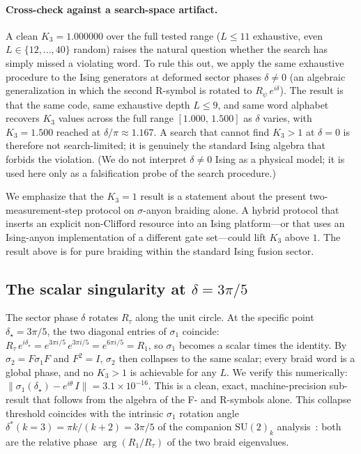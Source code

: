 \documentclass[aps,prx,reprint,amsmath,amssymb,floatfix,nofootinbib,superscriptaddress]{revtex4-2}
\begin{document}
\paragraph{Cross-check against a search-space artifact.}
A clean $K_{3}=1.000000$ over the full tested range ($L\leq11$
exhaustive, even $L\in\{12,\ldots,40\}$ random) raises the natural
question whether the search has simply missed a violating word. To
rule this out, we apply the same exhaustive procedure to the
Ising generators at deformed sector phases $\delta \neq 0$ (an
algebraic generalization in which the second R-symbol is rotated to
$R_{\psi}\,e^{i\delta}$). The result is that the same code, same
exhaustive depth $L \leq 9$, and same word alphabet recovers
$K_{3}$ values across the full range $[1.000,\,1.500]$ as $\delta$
varies, with $K_{3} = 1.500$ reached at $\delta/\pi \approx 1.167$.
A search that cannot find $K_{3} > 1$ at $\delta = 0$ is therefore
not search-limited; it is genuinely the standard Ising algebra that
forbids the violation. (We do not interpret $\delta \neq 0$ Ising as
a physical model; it is used here only as a falsification probe of
the search procedure.)

We emphasize that the $K_{3} = 1$ result is a statement about the
present two-measurement-step protocol on $\sigma$-anyon braiding
alone. A hybrid protocol that inserts an explicit non-Clifford
resource into an Ising platform---or that uses an Ising-anyon
implementation of a different gate set---could lift $K_{3}$ above $1$.
The result above is for pure braiding within the standard Ising
fusion sector.

\subsection{The scalar singularity at $\delta = 3\pi/5$}

The sector phase $\delta$ rotates $R_{\tau}$ along the unit circle.
At the specific point $\delta_{\star} = 3\pi/5$, the two diagonal
entries of $\sigma_{1}$ coincide:
$R_{\tau} \, e^{i\delta_{\star}}
   = e^{3\pi i/5} \, e^{3\pi i/5}
   = e^{6\pi i/5}
   = R_{1}$,
so $\sigma_{1}$ becomes a scalar times the identity. By
$\sigma_{2} = F \sigma_{1} F$ and $F^{2} = I$, $\sigma_{2}$ then
collapses to the same scalar; every braid word is a global phase, and
no $K_{3} > 1$ is achievable for any $L$. We verify this numerically:
$\|\sigma_{1}(\delta_{\star}) - e^{i\theta}\,I\| = 3.1 \times 10^{-16}$.
This is a clean, exact, machine-precision sub-result that follows
from the algebra of the F- and R-symbols alone. This collapse
threshold coincides with the intrinsic $\sigma_{1}$ rotation angle
$\delta^{\ast}(k{=}3) = \pi k/(k+2) = 3\pi/5$ of the companion
$\mathrm{SU}(2)_{k}$ analysis~\cite{Sayim2026SU2k}: both are the
relative phase $\arg(R_{1}/R_{\tau})$ of the two braid eigenvalues.
\end{document}
